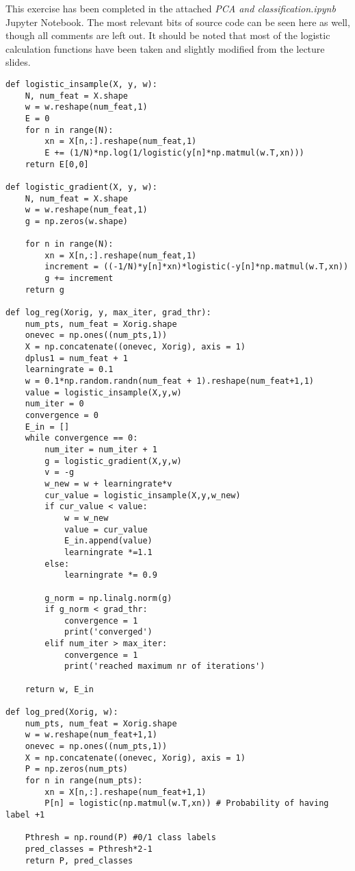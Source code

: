 This exercise has been completed in the attached \textit{PCA and classification.ipynb} Jupyter Notebook. The most relevant bits of source code can be seen here as well, though all comments are left out. It should be noted that most of the logistic calculation functions have been taken and slightly modified from the lecture slides.
\begin{verbatim}
def logistic_insample(X, y, w):
    N, num_feat = X.shape
    w = w.reshape(num_feat,1)
    E = 0
    for n in range(N):
        xn = X[n,:].reshape(num_feat,1)
        E += (1/N)*np.log(1/logistic(y[n]*np.matmul(w.T,xn)))
    return E[0,0]

def logistic_gradient(X, y, w):
    N, num_feat = X.shape
    w = w.reshape(num_feat,1)    
    g = np.zeros(w.shape)
    
    for n in range(N):
        xn = X[n,:].reshape(num_feat,1)
        increment = ((-1/N)*y[n]*xn)*logistic(-y[n]*np.matmul(w.T,xn))
        g += increment
    return g

def log_reg(Xorig, y, max_iter, grad_thr):       
    num_pts, num_feat = Xorig.shape
    onevec = np.ones((num_pts,1))
    X = np.concatenate((onevec, Xorig), axis = 1)    
    dplus1 = num_feat + 1
    learningrate = 0.1    
    w = 0.1*np.random.randn(num_feat + 1).reshape(num_feat+1,1)
    value = logistic_insample(X,y,w)
    num_iter = 0  
    convergence = 0
    E_in = []    
    while convergence == 0:
        num_iter = num_iter + 1                            
        g = logistic_gradient(X,y,w)
        v = -g
        w_new = w + learningrate*v
        cur_value = logistic_insample(X,y,w_new)
        if cur_value < value:
            w = w_new
            value = cur_value
            E_in.append(value)
            learningrate *=1.1
        else:
            learningrate *= 0.9   

        g_norm = np.linalg.norm(g)
        if g_norm < grad_thr:
            convergence = 1
            print('converged')
        elif num_iter > max_iter:
            convergence = 1
            print('reached maximum nr of iterations')
           
    return w, E_in 

def log_pred(Xorig, w):
    num_pts, num_feat = Xorig.shape
    w = w.reshape(num_feat+1,1)    
    onevec = np.ones((num_pts,1))
    X = np.concatenate((onevec, Xorig), axis = 1)
    P = np.zeros(num_pts)
    for n in range(num_pts):
        xn = X[n,:].reshape(num_feat+1,1)   
        P[n] = logistic(np.matmul(w.T,xn)) # Probability of having label +1
        
    Pthresh = np.round(P) #0/1 class labels
    pred_classes = Pthresh*2-1
    return P, pred_classes
\end{verbatim}
